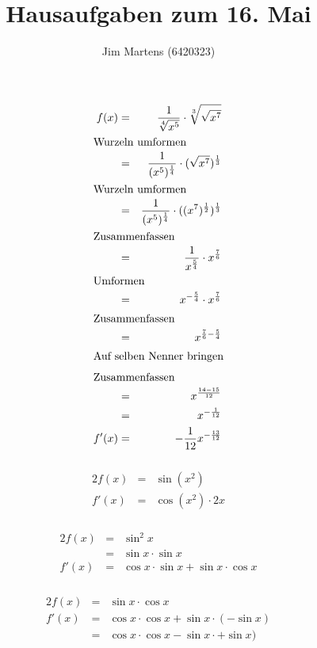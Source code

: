 \documentclass[10pt,a4paper,oneside,ngerman,numbers=noenddot]{scrartcl}
\begin{document}
\author{Jim Martens (6420323)}
\title{Hausaufgaben zum 16. Mai}
\maketitle
\section{} %
\subsubsection{} %
\begin{alignat*}{2}
f(x) &=& \frac{1}{\sqrt[4]{x^{5}}} \cdot \sqrt[3]{\sqrt{x^{7}}} \\
\intertext{Wurzeln umformen}
&=& \frac{1}{(x^{5})^{\frac{1}{4}}} \cdot (\sqrt{x^{7}})^{\frac{1}{3}} \\
\intertext{Wurzeln umformen}
&=& \frac{1}{(x^{5})^{\frac{1}{4}}} \cdot ((x^{7})^{\frac{1}{2}})^{\frac{1}{3}} \\
\intertext{Zusammenfassen}
&=& \frac{1}{x^{\frac{5}{4}}} \cdot x^{\frac{7}{6}} \\
\intertext{Umformen}
&=& x^{-\frac{5}{4}} \cdot x^{\frac{7}{6}} \\
\intertext{Zusammenfassen}
&=& x^{\frac{7}{6} - \frac{5}{4}} \\
\intertext{Auf selben Nenner bringen}
\intertext{Zusammenfassen}
&=& x^{\frac{14 - 15}{12}} \\
&=& x^{-\frac{1}{12}} \\
f'(x) &=& -\frac{1}{12}x^{-\frac{13}{12}}
\end{alignat*}
\subsubsection{} %
\begin{alignat*}{2}
f(x) &=& \sin (x^{2}) \\
f'(x) &=& \cos (x^{2}) \cdot 2x
\end{alignat*}
\subsubsection{} %
\begin{alignat*}{2}
f(x) &=& \sin ^{2} x \\
&=& \sin x \cdot \sin x \\
f'(x) &=& \cos x \cdot \sin x + \sin x \cdot \cos x
\end{alignat*}
\subsubsection{} %
\begin{alignat*}{2}
f(x) &=& \sin x \cdot \cos x \\
f'(x) &=& \cos x \cdot \cos x + \sin x \cdot (- \sin x) \\
&=& \cos x \cdot \cos x - \sin x \cdot + \sin x)
\end{alignat*}
\end{document}
